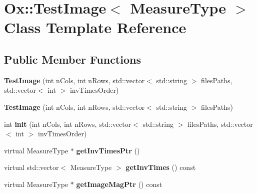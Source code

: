 \hypertarget{class_ox_1_1_test_image}{}\section{Ox\+:\+:Test\+Image$<$ Measure\+Type $>$ Class Template Reference}
\label{class_ox_1_1_test_image}
\subsection*{Public Member Functions}
\begin{DoxyCompactItemize}
\item 
{\bfseries Test\+Image} (int n\+Cols, int n\+Rows, std\+::vector$<$ std\+::string $>$ files\+Paths, std\+::vector$<$ int $>$ inv\+Times\+Order)\hypertarget{class_ox_1_1_test_image_a3b5ceff06d34b2ebd4a4ff215e156088}{}\label{class_ox_1_1_test_image_a3b5ceff06d34b2ebd4a4ff215e156088}

\item 
{\bfseries Test\+Image} (int n\+Cols, int n\+Rows, std\+::vector$<$ std\+::string $>$ files\+Paths)\hypertarget{class_ox_1_1_test_image_a794b321a180a2b19d88efc316e0d47aa}{}\label{class_ox_1_1_test_image_a794b321a180a2b19d88efc316e0d47aa}

\item 
int {\bfseries init} (int n\+Cols, int n\+Rows, std\+::vector$<$ std\+::string $>$ files\+Paths, std\+::vector$<$ int $>$ inv\+Times\+Order)\hypertarget{class_ox_1_1_test_image_aa802ece1484e88fd748b462c6e2a6cf9}{}\label{class_ox_1_1_test_image_aa802ece1484e88fd748b462c6e2a6cf9}

\item 
virtual Measure\+Type $\ast$ {\bfseries get\+Inv\+Times\+Ptr} ()\hypertarget{class_ox_1_1_test_image_a6dda2e0b1c2f9d285a29007a14441be3}{}\label{class_ox_1_1_test_image_a6dda2e0b1c2f9d285a29007a14441be3}

\item 
virtual std\+::vector$<$ Measure\+Type $>$ {\bfseries get\+Inv\+Times} () const \hypertarget{class_ox_1_1_test_image_accd975ba34db53a323810f506e0953d1}{}\label{class_ox_1_1_test_image_accd975ba34db53a323810f506e0953d1}

\item 
virtual Measure\+Type $\ast$ {\bfseries get\+Image\+Mag\+Ptr} () const \hypertarget{class_ox_1_1_test_image_a825435d601877f1595b5b04d8f2df2c1}{}\label{class_ox_1_1_test_image_a825435d601877f1595b5b04d8f2df2c1}


\end{DoxyCompactItemize}

